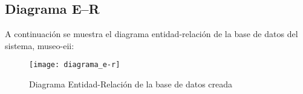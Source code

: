 \subsection{Diagrama E--R} 
A continuación se muestra el diagrama entidad-relación de la base de datos del sistema, museo-eii:
\begin{figure}[H]
\centering
\texttt{[image: diagrama\_e-r]}
\caption{Diagrama Entidad-Relación de la base de datos creada}
\end{figure}


%
%
